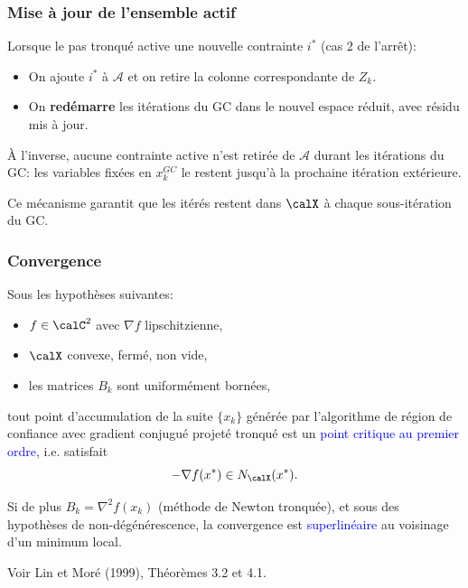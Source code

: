\documentclass[t,aspectratio=169,usepdftitle=false]{beamer}
\def\cX{\calX}
\begin{document}
\begin{frame}
\frametitle{Mise à jour de l'ensemble actif}

Lorsque le pas tronqué active une nouvelle contrainte $i^*$ (cas 2 de l'arrêt):

\begin{itemize}
\item On ajoute $i^*$ à $\mathcal{A}$ et on retire la colonne correspondante de $Z_k$.
\item On \textbf{redémarre} les itérations du GC dans le nouvel espace réduit, avec résidu mis à jour.
\end{itemize}

\mbox{}

À l'inverse, aucune contrainte active n'est retirée de $\mathcal{A}$ durant les itérations du GC: les variables fixées en $x_k^{GC}$ le restent jusqu'à la prochaine itération extérieure.

\mbox{}

Ce mécanisme garantit que les itérés restent dans $\cX$ à chaque sous-itération du GC.

\end{frame}

\begin{frame}
\frametitle{Convergence}

Sous les hypothèses suivantes:
\begin{itemize}
  \item $f \in \calC^2$ avec $\nabla f$ lipschitzienne,
  \item $\cX$ convexe, fermé, non vide,
  \item les matrices $B_k$ sont uniformément bornées,
\end{itemize}

tout point d'accumulation de la suite $\{ x_k \}$ générée par l'algorithme de région de confiance avec gradient conjugué projeté tronqué est un \textcolor{blue}{point critique au premier ordre}, i.e. satisfait
$$
-\nabla f(x^*) \in N_{\cX}(x^*).
$$

\mbox{}

Si de plus $B_k = \nabla^2 f(x_k)$ (méthode de Newton tronquée), et sous des hypothèses de non-dégénérescence, la convergence est \textcolor{blue}{superlinéaire} au voisinage d'un minimum local.

\mbox{}

{\footnotesize Voir Lin et Moré (1999), Théorèmes 3.2 et 4.1.}

\end{frame}
\end{document}
